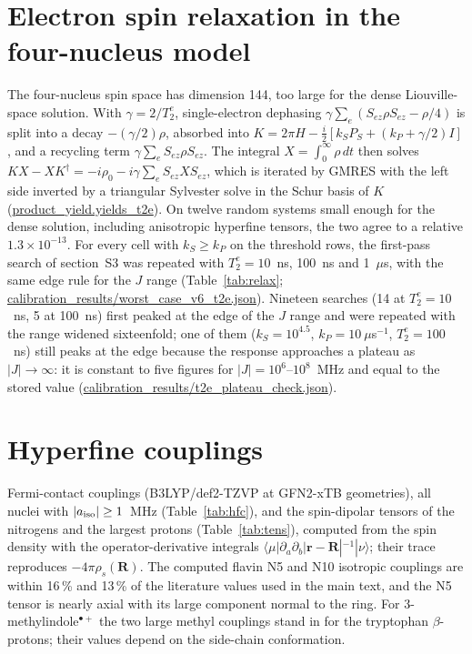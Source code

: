 \documentclass[11pt]{article}
\begin{document}
\section{Electron spin relaxation in the four-nucleus model}
The four-nucleus spin space has dimension 144, too large for the dense
Liouville-space solution. With $\gamma = 2/T_2^e$, single-electron dephasing
$\gamma\sum_e(S_{ez}\rho S_{ez}-\rho/4)$ is split into a decay $-(\gamma/2)\rho$,
absorbed into $K = 2\pi H - \tfrac i2[k_SP_S + (k_P+\gamma/2)I]$, and a recycling
term $\gamma\sum_eS_{ez}\rho S_{ez}$. The integral $X=\int_0^\infty\rho\,dt$ then
solves $KX - XK^\dagger = -i\rho_0 - i\gamma\sum_eS_{ez}XS_{ez}$, which is iterated
by GMRES with the left side inverted by a triangular Sylvester solve in the Schur
basis of $K$ (\url{product_yield.yields_t2e}). On twelve random systems small
enough for the dense solution, including anisotropic hyperfine tensors, the two
agree to a relative $1.3\times10^{-13}$. For every cell with $k_S\ge k_P$ on the
threshold rows, the first-pass search of section~S3 was repeated with
$T_2^e = 10$~ns, 100~ns and 1~$\mu$s, with the same edge rule for the $J$ range
(Table~\ref{tab:relax}; \url{calibration_results/worst_case_v6_t2e.json}).
Nineteen searches (14 at $T_2^e = 10$~ns, 5 at 100~ns) first peaked at the edge
of the $J$ range and were repeated with the range widened sixteenfold; one of them
($k_S = 10^{4.5}$, $k_P = 10~\mu$s$^{-1}$, $T_2^e = 100$~ns) still peaks at the
edge because the response approaches a plateau as $|J|\to\infty$: it is
constant to five figures for $|J| = 10^6$--$10^8$~MHz and equal to the stored
value (\url{calibration_results/t2e_plateau_check.json}).

\begin{table}[h]
\caption{Searched $F$ (\%) without and with single-electron dephasing in the
four-nucleus model. Rates in $\mu$s$^{-1}$.}
\label{tab:relax}
\centering

\end{table}

\section{Hyperfine couplings}
Fermi-contact couplings (B3LYP/def2-TZVP at GFN2-xTB geometries), all nuclei
with $|a_{\rm iso}|\ge1$~MHz (Table~\ref{tab:hfc}), and the spin-dipolar tensors
of the nitrogens and the largest protons (Table~\ref{tab:tens}), computed from
the spin density with the operator-derivative integrals
$\langle\mu|\partial_a\partial_b|\mathbf r-\mathbf R|^{-1}|\nu\rangle$; their
trace reproduces $-4\pi\rho_s(\mathbf R)$. The computed flavin N5 and N10
isotropic couplings are within 16\,\% and 13\,\% of the literature values used in
the main text,\cite{Lee2014} and the N5 tensor is nearly axial with its large
component normal to the ring. For 3-methylindole$^{\bullet+}$ the two large
methyl couplings stand in for the tryptophan $\beta$-protons; their values
depend on the side-chain conformation.
\end{document}
